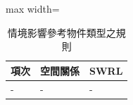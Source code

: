\begin{table}[htbp]
\centering
\caption{情境影響參考物件類型之規則}
\label{tab:contextToTypology}
\begin{adjustbox}{max width=\textwidth}
\renewcommand{\arraystretch}{1.4}
\begin{tabular}{>{\centering\arraybackslash}m{1cm} >{\centering\arraybackslash}m{3cm} >{\centering\arraybackslash}m{14cm} }
\toprule
項次 & 空間關係 & SWRL \\ 
\toprule
- & - & - \\ \midrule
\bottomrule
\end{tabular}
\end{adjustbox}
\end{table}